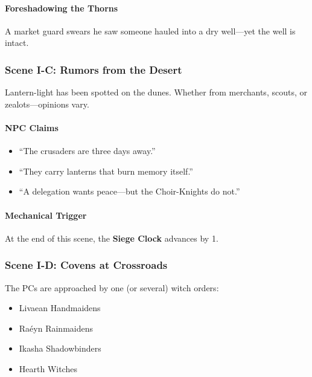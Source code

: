 \documentclass[11pt]{book}
\begin{document}
\paragraph{Foreshadowing the Thorns}
A market guard swears he saw someone hauled into a dry well---yet the well is intact.

\vspace{1em}

\subsubsection*{Scene I-C: Rumors from the Desert}

Lantern-light has been spotted on the dunes.  
Whether from merchants, scouts, or zealots---opinions vary.

\paragraph{NPC Claims}
\begin{itemize}[leftmargin=*]
    \item ``The crusaders are three days away.''  
    \item ``They carry lanterns that burn memory itself.''  
    \item ``A delegation wants peace---but the Choir-Knights do not.''  
\end{itemize}

\paragraph{Mechanical Trigger}
At the end of this scene, the \textbf{Siege Clock} advances by 1.

\vspace{1em}

\subsubsection*{Scene I-D: Covens at Crossroads}

The PCs are approached by one (or several) witch orders:
\begin{itemize}
    \item Livaean Handmaidens
    \item Raéyn Rainmaidens
    \item Ikasha Shadowbinders
    \item Hearth Witches
\end{itemize}
\end{document}
